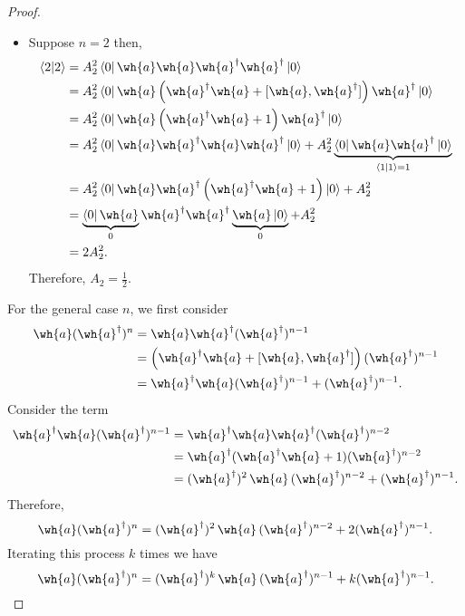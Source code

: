\documentclass[12pt, a4paper]{article}
\begin{document}
\begin{proof}
\begin{itemize}
        \item Suppose \(n=2\) then,
        \[\begin{aligned}
            \bra{2}\ket{2} &= A_2^2\bra{0} \wh{a}\wh{a}\wh{a}^{\dagger}\wh{a}^{\dagger} \ket{0} \\
            &= A_2^2\bra{0} \wh{a} \left( \wh{a}^{\dagger}\wh{a}+[\wh{a},\wh{a}^{\dagger}] \right) \wh{a}^{\dagger} \ket{0} \\
            &= A_2^2\bra{0} \wh{a} \left( \wh{a}^{\dagger}\wh{a}+1 \right)\wh{a}^{\dagger}\ket{0} \\
            &= A_2^2\bra{0} \wh{a}\wh{a}^{\dagger}\wh{a}\wh{a}^{\dagger}\ket{0}+A_2^2 \underbrace{\bra{0}\wh{a}\wh{a}^{\dagger}\ket{0}}_{\bra{1}\ket{1}=1} \\
            &= A_2^2 \bra{0} \wh{a} \wh{a}^{\dagger} \left( \wh{a}^{\dagger}\wh{a}+1 \right)\ket{0} +A_2^2 \\
            &= \underbrace{\bra{0}\wh{a}}_{0}\wh{a}^{\dagger}\wh{a}^{\dagger}\underbrace{\wh{a}\ket{0}}_{0} +A_2^2 \\
            &= 2A_2^2.
        \end{aligned}\]
        Therefore, \(A_2 =\frac{1}{2}\).
    \end{itemize}
    For the general case \(n\), we first consider 
    \[\begin{aligned}
        \wh{a}(\wh{a}^{\dagger})^n &= \wh{a}\wh{a}^{\dagger}(\wh{a}^{\dagger})^{n-1}  \\
        &= \left( \wh{a}^{\dagger}\wh{a}+[\wh{a},\wh{a}^{\dagger}] \right)(\wh{a}^{\dagger})^{n-1} \\
        &= \wh{a}^{\dagger}\wh{a}(\wh{a}^{\dagger})^{n-1}+(\wh{a}^{\dagger})^{n-1}.
    \end{aligned}\]
    Consider the term 
    \[\begin{aligned}
        \wh{a}^{\dagger} \wh{a}(\wh{a}^{\dagger})^{n-1} &= \wh{a}^{\dagger}\wh{a}\wh{a}^{\dagger}(\wh{a}^{\dagger})^{n-2} \\
        &= \wh{a}^{\dagger} (\wh{a}^{\dagger}\wh{a}+1) (\wh{a}^{\dagger})^{n-2} \\
        &= (\wh{a}^{\dagger})^2 \, \wh{a} \, (\wh{a}^{\dagger})^{n-2} +(\wh{a}^{\dagger})^{n-1}.
    \end{aligned}\]
    Therefore,
    \[\wh{a}(\wh{a}^{\dagger})^n=(\wh{a}^{\dagger})^2 \, \wh{a} \, (\wh{a}^{\dagger})^{n-2}+2(\wh{a}^{\dagger})^{n-1}.\]
    Iterating this process \(k\) times we have 
    \[\wh{a}(\wh{a}^{\dagger})^n = (\wh{a}^{\dagger})^k \, \wh{a} \, (\wh{a}^{\dagger})^{n-1} +k (\wh{a}^{\dagger})^{n-1}.\]

\end{proof}
\end{document}
